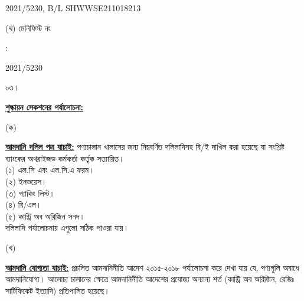 \documentclass[12pt]{article}
\newcommand{\blno}{SHWWSE211018213}
\newcommand{\menifest}{2021/5230}
\begin{document}
\begin{minipage}[t]{0.50\linewidth}
{\menifest}, B/L {\blno}
\\
\end{minipage}
\begin{minipage}[t]{0.05\linewidth}
\hspace*{1em}
\end{minipage}
\begin{minipage}[t]{0.45\linewidth}
(থ) মেনিফিস্ট নং
\end{minipage}
\begin{minipage}[t]{0.02\linewidth}
:
\end{minipage}
\begin{minipage}[t]{0.50\linewidth}
{\menifest}
\\
\end{minipage}
\normalsize
\begin{minipage}[t]{0.05\linewidth}
০৩।
\end{minipage}
\begin{minipage}[t]{0.95\linewidth}
\underline{\textbf{শুল্কায়ন সেকশনের পর্যালোচনা:}}
\end{minipage}
\begin{minipage}[t]{0.05\linewidth}
\hspace{1em}
\end{minipage}
\begin{minipage}[t]{0.05\linewidth}
(ক)
\end{minipage}
\begin{minipage}[t]{0.90\linewidth}
\underline{\textbf{আমদানি দলিল পত্র যাচাই:}}
পণ্যচালান খালাসের জন্য নিম্নবর্ণিত দলিলাদিসহ বি/ই দাখিল করা
হয়েছে যা সংশ্লিষ্ট ব্যাংকের অথরাইজড কর্মকর্তা কর্তৃক সত্যায়িত।
\\
(১) এল.সি এবং এল.সি.এ ফরম।
\\
(২) ইনভয়েস।
\\
(৩) প্যাকিং লিস্ট।
\\
(৪) বি/এল।
\\
(৫) কান্ট্রি অব অরিজিন সনদ।
\\
দলিলাদি পর্যালোচনায় এগুলো
সঠিক পাওয়া যায়।
\\
\end{minipage}
\begin{minipage}[t]{0.05\linewidth}
\hspace{1em}
\end{minipage}
\begin{minipage}[t]{0.05\linewidth}
(খ)
\end{minipage}
\begin{minipage}[t]{0.90\linewidth}
\underline{\textbf{আমদানি যোগ্যতা যাচাই:}}
প্রচলিত আমদানিনীতি আদেশ ২০১৫-২০১৮ পর্যালোচনা করে দেখা যায় যে, পণ্যগুলি অবাধে আমদানিযোগ্য।
আলোচ্য চালানের ক্ষেত্রে আমদানিনীতি আদেশের প্রযোজ্য অন্যান্য শর্ত (কান্ট্রি অব অরিজিন, রেজিঃ
সার্টিফিকেট ইত্যাদি) প্রতিপালিত হয়েছে।
\\
\end{minipage}
\end{document}
